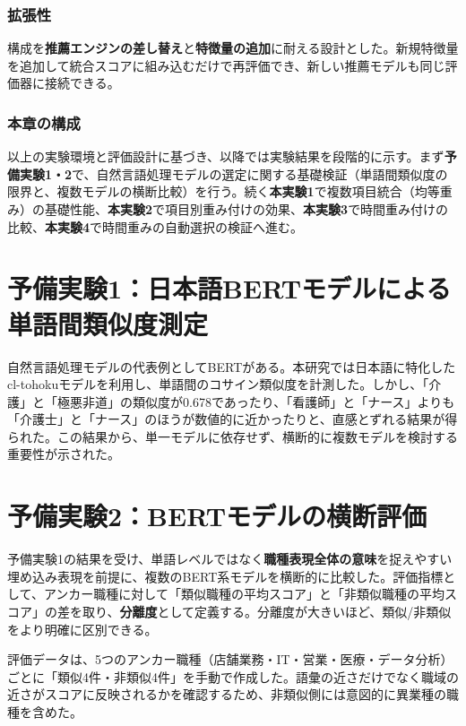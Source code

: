 \subsubsection*{拡張性}
構成を\textbf{推薦エンジンの差し替え}と\textbf{特徴量の追加}に耐える設計とした。新規特徴量を追加して統合スコアに組み込むだけで再評価でき、新しい推薦モデルも同じ評価器に接続できる。

\subsubsection*{本章の構成}
以上の実験環境と評価設計に基づき、以降では実験結果を段階的に示す。まず\textbf{予備実験1・2}で、自然言語処理モデルの選定に関する基礎検証（単語間類似度の限界と、複数モデルの横断比較）を行う。続く\textbf{本実験1}で複数項目統合（均等重み）の基礎性能、\textbf{本実験2}で項目別重み付けの効果、\textbf{本実験3}で時間重み付けの比較、\textbf{本実験4}で時間重みの自動選択の検証へ進む。

\section{予備実験1：日本語BERTモデルによる単語間類似度測定}
自然言語処理モデルの代表例としてBERTがある。本研究では日本語に特化したcl-tohokuモデルを利用し、単語間のコサイン類似度を計測した。しかし、「介護」と「極悪非道」の類似度が0.678であったり、「看護師」と「ナース」よりも「介護士」と「ナース」のほうが数値的に近かったりと、直感とずれる結果が得られた。この結果から、単一モデルに依存せず、横断的に複数モデルを検討する重要性が示された。
\section{予備実験2：BERTモデルの横断評価}
予備実験1の結果を受け、単語レベルではなく\textbf{職種表現全体の意味}を捉えやすい埋め込み表現を前提に、複数のBERT系モデルを横断的に比較した。評価指標として、アンカー職種に対して「類似職種の平均スコア」と「非類似職種の平均スコア」の差を取り、\textbf{分離度}として定義する。分離度が大きいほど、類似/非類似をより明確に区別できる。

評価データは、5つのアンカー職種（店舗業務・IT・営業・医療・データ分析）ごとに「類似4件・非類似4件」を手動で作成した。語彙の近さだけでなく職域の近さがスコアに反映されるかを確認するため、非類似側には意図的に異業種の職種を含めた。

